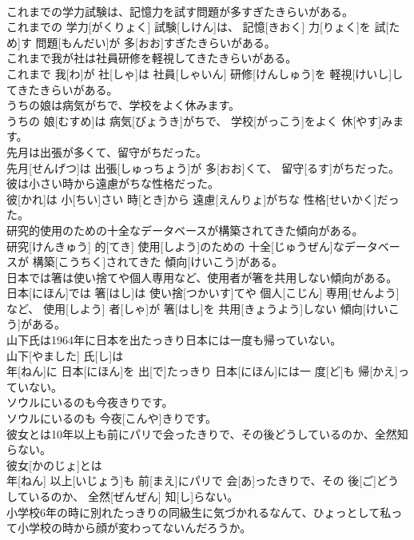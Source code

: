 \documentclass[8pt]{extreport}
\begin{document}
\begin{CJK}{UTF8}{min}
\\	これまでの学力試験は、記憶力を試す問題が多すぎたきらいがある。	
\\	これまでの 学力[がくりょく] 試験[しけん]は、 記憶[きおく] 力[りょく]を 試[ため]す 問題[もんだい]が 多[おお]すぎたきらいがある。
\\	これまで我が社は社員研修を軽視してきたきらいがある。	
\\	これまで 我[わ]が 社[しゃ]は 社員[しゃいん] 研修[けんしゅう]を 軽視[けいし]してきたきらいがある。
\\	うちの娘は病気がちで、学校をよく休みます。	
\\	うちの 娘[むすめ]は 病気[びょうき]がちで、 学校[がっこう]をよく 休[やす]みます。
\\	先月は出張が多くて、留守がちだった。	
\\	先月[せんげつ]は 出張[しゅっちょう]が 多[おお]くて、 留守[るす]がちだった。
\\	彼は小さい時から遠慮がちな性格だった。	
\\	彼[かれ]は 小[ちい]さい 時[とき]から 遠慮[えんりょ]がちな 性格[せいかく]だった。
\\	研究的使用のための十全なデータベースが構築されてきた傾向がある。	
\\	研究[けんきゅう] 的[てき] 使用[しよう]のための 十全[じゅうぜん]なデータベースが 構築[こうちく]されてきた 傾向[けいこう]がある。
\\	日本では箸は使い捨てや個人専用など、使用者が箸を共用しない傾向がある。	
\\	日本[にほん]では 箸[はし]は 使い捨[つかいす]てや 個人[こじん] 専用[せんよう]など、 使用[しよう] 者[しゃ]が 箸[はし]を 共用[きょうよう]しない 傾向[けいこう]がある。
\\	山下氏は1964年に日本を出たっきり日本には一度も帰っていない。	
\\	山下[やました] 氏[し]は 
\\	年[ねん]に 日本[にほん]を 出[で]たっきり 日本[にほん]には一 度[ど]も 帰[かえ]っていない。
\\	ソウルにいるのも今夜きりです。	
\\	ソウルにいるのも 今夜[こんや]きりです。
\\	彼女とは10年以上も前にパリで会ったきりで、その後どうしているのか、全然知らない。	
\\	彼女[かのじょ]とは 
\\	年[ねん] 以上[いじょう]も 前[まえ]にパリで 会[あ]ったきりで、その 後[ご]どうしているのか、 全然[ぜんぜん] 知[し]らない。
\\	小学校6年の時に別れたっきりの同級生に気づかれるなんて、ひょっとして私って小学校の時から顔が変わってないんだろうか。	

\end{CJK}
\end{document}
